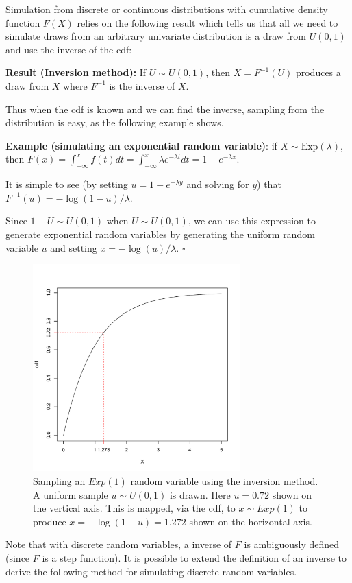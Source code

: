 \documentclass[11pt]{article}
\begin{document}
 Simulation from discrete or continuous distributions with cumulative density function $F(X)$ relies on the following result which tells us that all we need to simulate draws from  an arbitrary univariate distribution is a draw from  $U(0,1)$ and use the inverse of the cdf:

{\bf Result (Inversion method):} If  $U \sim U(0,1)$, then $X =  F^{-1}(U)$ produces a draw from $X$ where $F^{-1}$ is the inverse of $X$. 

Thus when the cdf is known and we can find the inverse, sampling from the distribution is easy, as the following example shows.

{\bf Example (simulating an exponential random variable)}:  if $X \sim \mbox{Exp}(\lambda)$, then $F(x) = \int_{-\infty}^x f(t) dt =  \int_{-\infty}^x \lambda e^{-\lambda t} dt = 1-e^{-\lambda x}$. 

 It is simple to see (by setting $u = 1-e^{-\lambda y}$ and solving for $y$)  that $F^{-1}(u) = - \log(1-u)/\lambda$. 
  
 Since $1-U \sim U(0,1)$ when $U \sim U(0,1)$, we can use this expression to generate exponential random variables by generating the uniform random variable $u$ and setting $x = - \log(u)/\lambda$. \hfill $\square$

\begin{figure}
\centering
\includegraphics[width = 8cm]{figures/inversionsample.pdf}
\caption{Sampling an $Exp(1)$ random variable using the inversion method.  A uniform sample $u \sim U(0,1)$ is drawn.  Here $u = 0.72$ shown on the vertical axis.  This is mapped, via the cdf, to $x \sim Exp(1)$ to produce $x = -\log(1-u) = 1.272$ shown on the horizontal axis. }
\end{figure}

Note that with discrete random variables, a  inverse of $F$ is ambiguously defined (since $F$ is a step function).  It is possible to extend the definition of an inverse to derive the following method for simulating discrete random variables.
\end{document}
